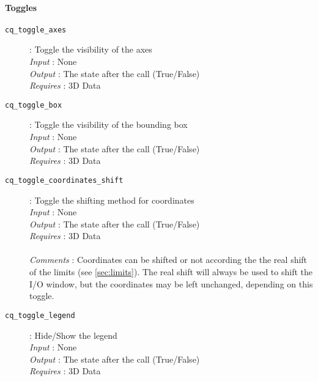 \documentclass[a4paper,notitlepage,11pt]{article}
\def\Conqtour{\textsc{Conqtour}}
\begin{document}
\paragraph{Toggles}
\label{sec:py-function-toggles}
\index{\Conqtour\ State!Toggles}

\begin{description}
\item[\texttt{cq\_toggle\_axes}]: Toggle the visibility of the axes\\
  \emph{Input} : None\\
  \emph{Output} : The state after the call (True/False)\\
  \emph{Requires} : 3D Data\\
\end{description}

\begin{description}
\item[\texttt{cq\_toggle\_box}]: Toggle the visibility of the bounding box\\
  \emph{Input} : None\\
  \emph{Output} : The state after the call (True/False)\\
  \emph{Requires} : 3D Data\\
\end{description}

\begin{description}
\item[\texttt{cq\_toggle\_coordinates\_shift}]: Toggle the shifting method for coordinates\\
  \emph{Input} : None\\
  \emph{Output} : The state after the call (True/False)\\
  \emph{Requires} : 3D Data\\
  \\
  \emph{Comments} : Coordinates can be shifted or not according the the real shift of the limits 
  (see \ref{sec:limits}). The real shift will always be used to shift the I/O window, but the coordinates may be left 
  unchanged, depending on this toggle.
\end{description}

\begin{description}
\item[\texttt{cq\_toggle\_legend}]: Hide/Show the legend\\
  \emph{Input} : None\\
  \emph{Output} : The state after the call (True/False)\\
  \emph{Requires} : 3D Data\\
\end{description}
\end{document}
